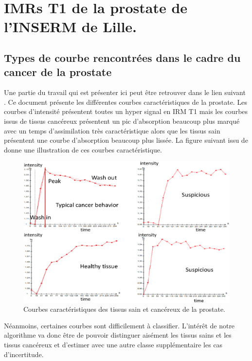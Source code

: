 \chapter{IMRs T1 de la prostate de l'INSERM de Lille.}

\section{Types de courbe rencontrées dans le cadre du cancer de la prostate}

Une partie du travail qui est présenter ici peut être retrouver dans le lien suivant \cite{doi2007computer}.
Ce document présente les différentes courbes caractéristiques de la prostate. Les courbes d'intensité présentent toutes un hyper signal en IRM T1 mais les courbes issus de tissus cancéreux présentent un pic d'absorption beaucoup plus marqué avec un temps d'assimilation très caractéristique alors que les tissus sain présentent une courbe d'absorption beaucoup plus lissée. La figure suivant issu de \cite{doi2007computer} donne une illustration de ces courbes caractéristique.

\medskip

\begin{figure}[H]
\centering
    \includegraphics[scale=0.4,angle=0]{Images/CourbeProstate.png}
    \caption{Courbes caractéristiques des tissus sain et cancéreux de la prostate.}
    \label{fig:CourbeProstate}
\end{figure}

\medskip

Néanmoins, certaines courbes sont difficilement à classifier. L'intérêt de notre algorithme va donc être de pouvoir distinguer aisément les tissus sains et les tissus cancéreux et d'estimer avec une autre classe supplémentaire les cas d'incertitude.

